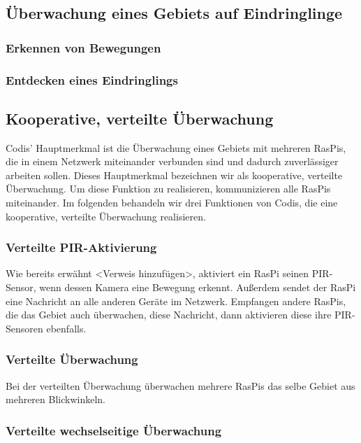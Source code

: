 \documentclass[journal]{IEEEtran}
\begin{document}
\subsection{Überwachung eines Gebiets auf Eindringlinge}


\subsubsection{Erkennen von Bewegungen}


\subsubsection{Entdecken eines Eindringlings}


\subsection{Kooperative, verteilte Überwachung}

Codis' Hauptmerkmal ist die Überwachung eines Gebiets mit mehreren RasPis, die in einem Netzwerk miteinander verbunden sind und dadurch zuverlässiger arbeiten sollen. Dieses Hauptmerkmal bezeichnen wir als kooperative, verteilte Überwachung. Um diese Funktion zu realisieren, kommunizieren alle RasPis miteinander. Im folgenden behandeln wir drei Funktionen von Codis, die eine kooperative, verteilte Überwachung realisieren.

\subsubsection{Verteilte PIR-Aktivierung}

Wie bereits erwähnt <Verweis hinzufügen>, aktiviert ein RasPi seinen PIR-Sensor, wenn dessen Kamera eine Bewegung erkennt. Außerdem sendet der RasPi eine Nachricht an alle anderen Geräte im Netzwerk. Empfangen andere RasPis, die das Gebiet auch überwachen, diese Nachricht, dann aktivieren diese ihre PIR-Sensoren ebenfalls. 

\subsubsection{Verteilte Überwachung}

Bei der verteilten Überwachung überwachen mehrere RasPis das selbe Gebiet aus mehreren Blickwinkeln. 

\subsubsection{Verteilte wechselseitige Überwachung}
\end{document}
